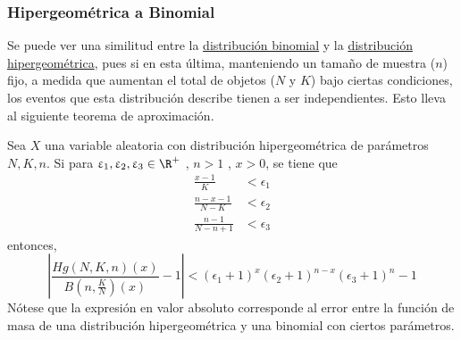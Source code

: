 \subsubsection{Hipergeométrica a Binomial}
Se puede ver una similitud entre la \hyperref[dist:binom]{distribución binomial}
y la \hyperref[dist:hip]{distribución hipergeométrica}, pues si en esta última, manteniendo
un tamaño de muestra ($n$) fijo, a medida que aumentan el total de objetos ($N$ y $K$) bajo
ciertas condiciones, los eventos que esta distribución describe tienen a ser independientes.
Esto lleva al siguiente teorema de aproximación.

\begin{Teo}
  Sea $X$ una variable aleatoria con distribución hipergeométrica de
  parámetros $N,K,n$. Si para $\epsilon_1,\epsilon_2,\epsilon_3\in\R^+$ , $n > 1$ , $x > 0$,
  se tiene que
  \begin{align*}
    \frac{x-1}{K}         &< \epsilon_1\\
    \frac{n-x-1}{N-K}     &< \epsilon_2\\
    \frac{n-1}{N - n + 1} &< \epsilon_3
  \end{align*}
  entonces,
  \[
    \left|\dfrac{Hg(N,K,n)(x)}{B\left(n,\frac{K}{N}\right)(x)} - 1\right| 
    < (\epsilon_1 + 1)^x(\epsilon_2+1)^{n-x}(\epsilon_3+1)^n - 1
  \]
  Nótese que la expresión en valor absoluto corresponde al error entre la
  función de masa de una distribución hipergeométrica y una binomial con ciertos
  parámetros.
\end{Teo}


